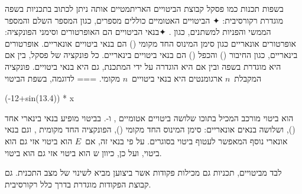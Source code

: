 \begin{Example}
  בשפות תכנות כמו פסקל קבוצת הביטויים האריתמטיים אותה ניתן לכתוב בתכניות בשפה מוגדרת רקורסיבית:
  ✦ הביטויים
  האטומיים כוללים מספרים, כגון המספר השלם
   והמספר הממשי
  והפניות למשתנים, כגון .
  ✦בנאי הביטויים הם האופרטורים וסימני הפונקציה:
  אופרטורים אונאריים כגון סימן המינוס החד מקומי () הם בנאי ביטויים אונאריים.
  אופרטורים בינאריים, כגון החיבור () והכפל () הם בנאי
  ביטויים בינאריים. כל פונקציה של פסקל, בין אם היא מוגדרת בשפה ובין אם היא הוגדרה על ידי המתכנת, גם היא בנאי ביטויים. פונקציה המקבלת~$n$ ארגומנטים היא בנאי ביטויים~$n$ מקומי.
===
  לדוגמה, בשפת  הביטוי
  \begin{PASCAL}
(-12+sin(13.4)) * x
\end{PASCAL}
  הוא ביטוי מורכב המכיל בתוכו שלושה ביטויים אטומיים
  ,  ו-. בביטוי מופיע בנאי בינארי אחד (), ושלושה בנאים אונאריים: סימן המינוס החד מקומי (), הפונקציה החד מקומית , וגם בנאי אונארי נוסף המאפשר לעטוף ביטוי בסוגרים. על פי בנאי זה, אם~$E$ הוא ביטוי אזי גם
   הוא ביטוי, ועל כן, כיוון ש  הוא ביטוי
  אזי גם  הוא ביטוי.
\end{Example}

לבד מביטויים, תכניות גם מכילות פקודות אשר ביצוען מביא לשינוי של מצב התכנית. גם קבוצת הפקודות מוגדרת בדרך כלל רקורסיבית.

